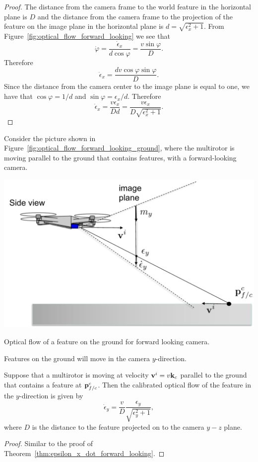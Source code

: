 \begin{proof}
  The distance from the camera frame to the world feature in the horizontal plane is $D$ and the distance from the camera frame to the projection of the feature on the image plane in the horizontal plane is $d=\sqrt{\epsilon_x^2+1}$.
	From Figure~\ref{fig:optical_flow_forward_looking} we see that
	\[
	\dot{\varphi} = \frac{\dot{\epsilon}_x}{d\cos\varphi} = \frac{v\sin\varphi}{D}.
	\]
	Therefore
	\[
	\dot{\epsilon}_x = \frac{d v \cos\varphi \sin\varphi}{D}.
	\]
	Since the distance from the camera center to the image plane is equal to one, we have that $\cos\varphi = 1/d$ and $\sin\varphi = \epsilon_x/d$.  Therefore
	\[
	\dot{\epsilon}_x = \frac{v \epsilon_x}{D d}=\frac{v \epsilon_x}{D\sqrt{\epsilon_x^2+1}}.
	\]
\end{proof}

%
Consider the picture shown in Figure~\ref{fig:optical_flow_forward_looking_ground}, where the multirotor is moving parallel to the ground that contains features, with a forward-looking camera.  
\begin{marginfigure}
	\includegraphics[width=\linewidth]{chap7_optical_flow/figures/optical_flow_forward_looking_ground}
	\caption{Optical flow of a feature on the ground for forward looking camera.}
	\label{fig:optical_flow_forward_looking_ground}
\end{marginfigure}
Features on the ground will move in the camera $y$-direction.  
\begin{theorem} \label{thm:epsilon_y_dot_forward_looking}
	Suppose that a multirotor is moving at velocity $\mathbf{v}^i = v\mathbf{k}_c$ parallel to the ground that contains a feature at $\mathbf{p}_{f/c}^c$.  Then the calibrated optical flow of the feature in the $y$-direction is given by
	\begin{equation}\label{eq:epsilon_y_dot_forward_looking}
	\dot{\epsilon}_y = \frac{v}{D}\frac{\epsilon_y}{\sqrt{\epsilon_y^2+1}},
	\end{equation}
	where $D$ is the distance to the feature projected on to the camera $y-z$ plane.
\end{theorem}
\begin{proof}
Similar to the proof of Theorem~\ref{thm:epsilon_x_dot_forward_looking}.
\end{proof}

